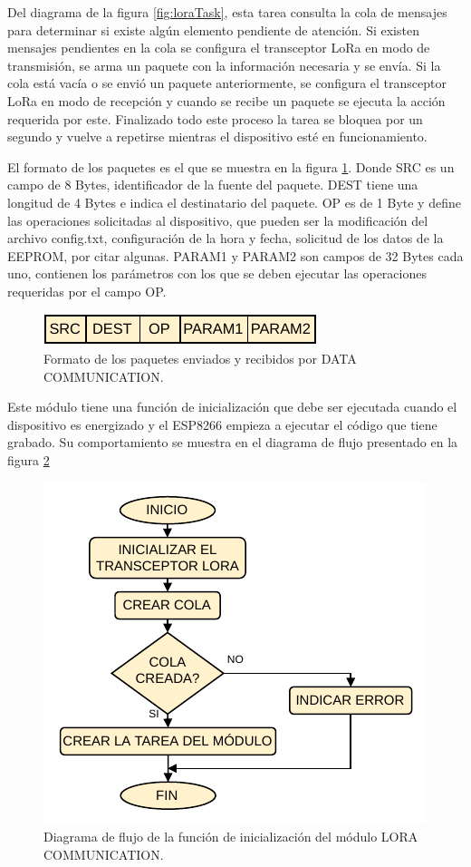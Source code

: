 Del diagrama de la figura \ref{fig:loraTask}, esta tarea consulta la cola de mensajes para determinar si existe algún elemento pendiente de atención. Si existen mensajes pendientes en la cola se configura el transceptor LoRa en modo de transmisión, se arma un paquete con la información necesaria y se envía. Si la cola está vacía o se envió un paquete anteriormente, se configura el transceptor LoRa en modo de recepción y cuando se recibe un paquete se ejecuta la acción requerida por este. Finalizado todo este proceso la tarea se bloquea por un segundo y vuelve a repetirse mientras el dispositivo esté en funcionamiento.

El formato de los paquetes es el que se muestra en la figura \ref{fig:loraRxPacket}. Donde SRC es un campo de 8 Bytes, identificador de la fuente del paquete. DEST tiene una longitud de 4 Bytes e indica el destinatario del paquete. OP es de 1 Byte y define las operaciones solicitadas al dispositivo, que pueden ser la modificación del archivo config.txt, configuración de la hora y fecha, solicitud de los datos de la EEPROM, por citar algunas. PARAM1 y PARAM2 son campos de 32 Bytes cada uno, contienen los parámetros con los que se deben ejecutar las operaciones requeridas por el campo OP.

\begin{figure}[h]
	\centering
	\includegraphics[scale=1]{./Figures/lora_communication_rx_packet.pdf}
	\caption{Formato de los paquetes enviados y recibidos por DATA COMMUNICATION.}
		\label{fig:loraRxPacket}
\end{figure}

Este módulo tiene una función de inicialización que debe ser ejecutada cuando el dispositivo es energizado y el ESP8266 empieza a ejecutar el código que tiene grabado. Su comportamiento se muestra en el diagrama de flujo presentado en la figura \ref{fig:loraInit}

\begin{figure}[h]
	\centering
	\includegraphics[scale=1]{./Figures/lora_communication_init.pdf}
	\caption{Diagrama de flujo de la función de inicialización del módulo LORA COMMUNICATION.}
		\label{fig:loraInit}
\end{figure}

